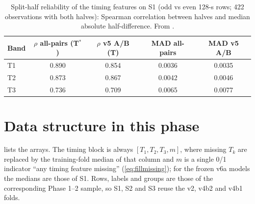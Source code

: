 \begin{table}[htbp]
\centering\small
\caption[Split-half reliability]{Split-half reliability of the timing features on S1 (odd vs even 128-s rows; 422
observations with both halves): Spearman correlation between halves and median absolute half-difference. From
.}
\label{tab:p3reliab}
\begin{tabular}{@{}lcccc@{}}
\toprule
Band & $\rho$ all-pairs (T$^*$) & $\rho$ v5 A/B (T) & MAD all-pairs & MAD v5 A/B \\
\midrule
T1 & 0.890 & 0.854 & 0.0036 & 0.0035 \\
T2 & 0.873 & 0.867 & 0.0042 & 0.0046 \\
T3 & 0.736 & 0.709 & 0.0065 & 0.0077 \\
\bottomrule
\end{tabular}
\end{table}

\section{Data structure in this phase}\label{sec:p3structure}
 lists the arrays. The timing block is always $[T_1,T_2,T_3,m]$, where missing $T_k$ are replaced by
the training-fold median of that column and $m$ is a single 0/1 indicator ``any timing feature missing'' (\cref{eq:fillmissing});
for the frozen v6a models the medians are those of S1. Rows, labels and groups are those of the corresponding Phase 1--2
sample, so S1, S2 and S3 reuse the v2, v4b2 and v4b1 folds.

